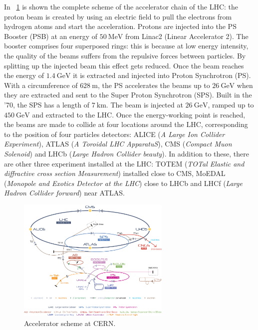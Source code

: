 In \figurename~\ref{Cern-Accelerator-Complex}  is shown the complete scheme of the accelerator chain of the LHC: the proton beam is created by using an electric field to pull the electrons from hydrogen atoms and start the acceleration. Protons are injected into the PS Booster (PSB) at an  energy of $50~\mathrm{MeV}$ from Linac2 (Linear Accelerator 2). The booster comprises four superposed rings: this is because at low energy intensity, the quality of the beams suffers from the repulsive forces between particles. By splitting up the injected beam this effect gets reduced. Once the beam reaches the energy of $1.4~\mathrm{GeV}$ it is extracted and injected into Proton Synchrotron (PS). With a circumference of $628~\mathrm{m}$, the PS accelerates the beams up to $26~\mathrm{GeV}$ when they are extracted and sent to the Super Proton Synchrotron (SPS). Built in the '70, the SPS has a length of $7~\mathrm{km}$. The beam is injected at $26~\mathrm{GeV}$, ramped up to $450~\mathrm{GeV}$ and extracted to the LHC. %
Once the energy-working point is reached, the beams are made to collide at four locations around the LHC, corresponding to the position of four particles detectors: ALICE (\emph{A Large Ion Collider Experiment}), ATLAS (\emph{A Toroidal LHC ApparatuS}), CMS (\emph{Compact Muon Solenoid}) and LHCb (\emph{Large Hadron Collider beauty}). In addition to these, there are other three experiment installed at the LHC: TOTEM (\textit{TOTal Elastic and diffractive cross section Measurement}) installed close to CMS, MoEDAL (\textit{Monopole and Exotics Detector at the LHC}) close to LHCb and LHCf (\textit{Large Hadron Collider forward}) near ATLAS. \\
\begin{figure}[htbp]
\centering
\includegraphics[width=0.65\textwidth]{Images/Cern-Accelerator-Complex}
\caption{Accelerator scheme at CERN.}
\label{Cern-Accelerator-Complex}
\end{figure}
